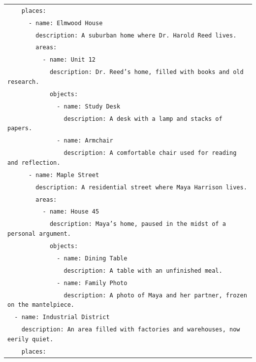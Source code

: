 \documentclass[letterpaper]{article} %
\begin{document}
\begin{small}
\begin{longtable}{p{\textwidth}}
    \texttt{\ \ \ \ places:} \\
    \texttt{\ \ \ \ \ \ - name: Elmwood House} \\
    \texttt{\ \ \ \ \ \ \ \ description: A suburban home where Dr. Harold Reed lives.} \\
    \texttt{\ \ \ \ \ \ \ \ areas:} \\
    \texttt{\ \ \ \ \ \ \ \ \ \ - name: Unit 12} \\
    \texttt{\ \ \ \ \ \ \ \ \ \ \ \ description: Dr. Reed's home, filled with books and old research.} \\
    \texttt{\ \ \ \ \ \ \ \ \ \ \ \ objects:} \\
    \texttt{\ \ \ \ \ \ \ \ \ \ \ \ \ \ - name: Study Desk} \\
    \texttt{\ \ \ \ \ \ \ \ \ \ \ \ \ \ \ \ description: A desk with a lamp and stacks of papers.} \\
    \texttt{\ \ \ \ \ \ \ \ \ \ \ \ \ \ - name: Armchair} \\
    \texttt{\ \ \ \ \ \ \ \ \ \ \ \ \ \ \ \ description: A comfortable chair used for reading and reflection.} \\
    \texttt{\ \ \ \ \ \ - name: Maple Street} \\
    \texttt{\ \ \ \ \ \ \ \ description: A residential street where Maya Harrison lives.} \\
    \texttt{\ \ \ \ \ \ \ \ areas:} \\
    \texttt{\ \ \ \ \ \ \ \ \ \ - name: House 45} \\
    \texttt{\ \ \ \ \ \ \ \ \ \ \ \ description: Maya's home, paused in the midst of a personal argument.} \\
    \texttt{\ \ \ \ \ \ \ \ \ \ \ \ objects:} \\
    \texttt{\ \ \ \ \ \ \ \ \ \ \ \ \ \ - name: Dining Table} \\
    \texttt{\ \ \ \ \ \ \ \ \ \ \ \ \ \ \ \ description: A table with an unfinished meal.} \\
    \texttt{\ \ \ \ \ \ \ \ \ \ \ \ \ \ - name: Family Photo} \\
    \texttt{\ \ \ \ \ \ \ \ \ \ \ \ \ \ \ \ description: A photo of Maya and her partner, frozen on the mantelpiece.} \\
    \texttt{\ \ - name: Industrial District} \\
    \texttt{\ \ \ \ description: An area filled with factories and warehouses, now eerily quiet.} \\
    \texttt{\ \ \ \ places:} \\

\end{longtable}
\end{small}
\end{document}
